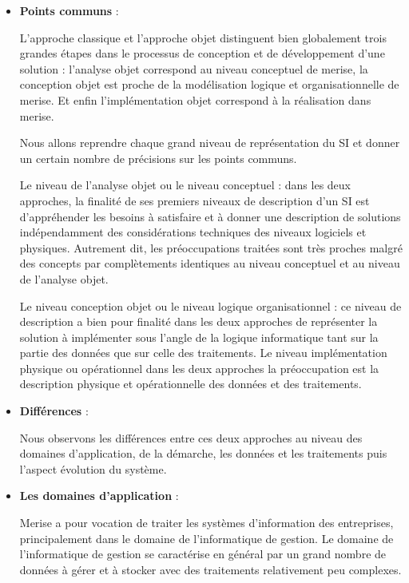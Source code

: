 \vspace{1em}
\begin{itemize}
	\setlength\itemsep{1em}
	\item \textbf{Points communs} :

	      L’approche classique et l’approche objet distinguent bien globalement trois grandes étapes dans le processus de conception et de développement d’une solution : l’analyse objet correspond au niveau conceptuel de merise, la conception objet est proche de la modélisation logique et organisationnelle de merise. 
		  Et enfin l’implémentation objet correspond à la réalisation dans merise.

	      Nous allons reprendre chaque grand niveau de représentation du SI et donner un certain nombre
	      de précisions sur les points communs.

	      Le niveau de l’analyse objet ou le niveau conceptuel : dans les deux approches, la finalité de ses premiers niveaux de description d’un SI est d’appréhender les besoins à satisfaire et à donner une description de solutions indépendamment des considérations techniques des niveaux logiciels et physiques. Autrement dit, les préoccupations traitées sont très proches malgré des concepts par complètements identiques au niveau conceptuel et au niveau de l’analyse objet.

	      Le niveau conception objet ou le niveau logique organisationnel : ce niveau de description a bien pour finalité dans les deux approches de représenter la solution à implémenter sous l’angle de la logique informatique tant sur la partie des données que sur celle des traitements. Le niveau implémentation physique ou opérationnel dans les deux approches la préoccupation est la description physique et opérationnelle des données et des traitements.

	\item \textbf{Différences} :

	      Nous observons les différences entre ces deux approches au niveau des domaines d’application,
	      de la démarche, les données et les traitements puis l’aspect évolution du système.

	\item \textbf{Les domaines d’application} :

	      Merise a pour vocation de traiter les systèmes d’information des entreprises, principalement dans le domaine de l’informatique de gestion. Le domaine de l’informatique de gestion se caractérise en général par un grand nombre de données à gérer et à stocker avec des traitements relativement peu complexes.


\end{itemize}
